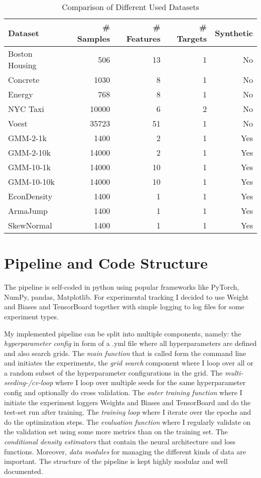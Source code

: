 \documentclass{article}
\begin{document}
\begin{table}
  \caption{Comparison of Different Used Datasets}
  \label{tab:dataset_overview}
  \centering
  \begin{tabular}{lrrrr}
    \toprule
    Dataset & \# Samples & \# Features & \# Targets & Synthetic \\
    \midrule
    Boston Housing & 506 & 13 & 1 & No \\
    Concrete & 1030 & 8 & 1 & No \\
    Energy & 768 & 8 & 1 & No \\
    NYC Taxi & 10000 & 6 & 2 & No \\
    Voest & 35723 & 51 & 1 & No \\
    GMM-2-1k & 1400 & 2 & 1 & Yes \\
    GMM-2-10k & 14000 & 2 & 1 & Yes \\
    GMM-10-1k & 14000 & 10 & 1 & Yes \\
    GMM-10-10k & 14000 & 10 & 1 & Yes \\
    EconDensity & 1400 & 1 & 1 & Yes \\
    ArmaJump & 1400 & 1 & 1 & Yes \\
    SkewNormal & 1400 & 1 & 1 & Yes \\
    \bottomrule
  \end{tabular}
\end{table}



\section{Pipeline and Code Structure}\label{sec:pipeline}
The pipeline is self-coded in python using popular frameworks like PyTorch, NumPy, pandas, Matplotlib. For experimental tracking I decided to use Weight and Biases and TensorBoard together with simple logging to log files for some experiment types.

My implemented pipeline can be split into multiple components, namely: the \textit{hyperparameter config} in form of a .yml file where all hyperparameters are defined and also search grids. The \textit{main function} that is called form the command line and initiates the experiments, the \textit{grid search} component where I loop over all or a random subset of the hyperparameter configurations in the grid. The \textit{multi-seeding-/cv-loop} where I loop over multiple seeds for the same hyperparameter config and optionally do cross validation. The \textit{outer training function} where I initiate the experiment loggers Weights and Biases and TensorBoard and do the test-set run after training. The \textit{training loop} where I iterate over the epochs and do the optimization steps. The \textit{evaluation function} where I regularly validate on the validation set using some more metrics than on the training set. The \textit{conditional density estimators} that contain the neural architecture and loss functions. Moreover, \textit{data modules} for managing the different kinds of data are important. The structure of the pipeline is kept highly modular and well documented.
\end{document}
